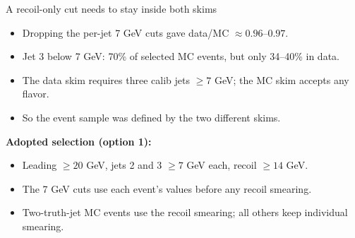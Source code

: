 \documentclass[aspectratio=169,10pt]{beamer}
\begin{document}
\begin{frame}{A recoil-only cut needs to stay inside both skims}
  \begin{itemize}
    \item Dropping the per-jet 7 GeV cuts gave data/MC $\approx 0.96$--$0.97$.
    \item Jet 3 below 7 GeV: 70\% of selected MC events, but only 34--40\% in data.
    \item The data skim requires three calib jets $\geq 7$ GeV; the MC skim accepts any flavor.
    \item So the event sample was defined by the two different skims.
  \end{itemize}
  \vspace{0.5em}
  \textbf{Adopted selection (option 1):}
  \begin{itemize}
    \item Leading $\geq 20$ GeV, jets 2 and 3 $\geq 7$ GeV each, recoil $\geq 14$ GeV.
    \item The 7 GeV cuts use each event's values before any recoil smearing.
    \item Two-truth-jet MC events use the recoil smearing; all others keep individual smearing.
  \end{itemize}
\end{frame}
\end{document}
